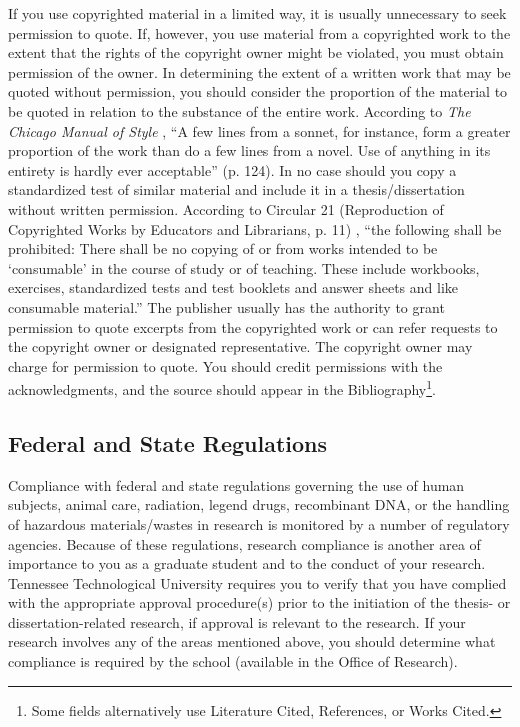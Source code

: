 If you use copyrighted material in a limited way, it is usually
unnecessary to seek permission to quote. If, however, you use material
from a copyrighted work to the extent that the rights of the copyright
owner might be violated, you must obtain permission of the owner. In
determining the extent of a written work that may be quoted without
permission, you should consider the proportion of the material to be
quoted in relation to the substance of the entire work. According to
\textit{The Chicago Manual of Style} \cite{chicago1982}, ``A few lines
from a sonnet, for instance, form a greater proportion of the work
than do a few lines from a novel. Use of anything in its entirety is
hardly ever acceptable'' (p. 124). In no case should you copy a
standardized test of similar material and include it in a
the\-sis/dis\-ser\-ta\-tion without written permission. According to
Circular 21 (Reproduction of Copyrighted Works by Educators and
Librarians, p. 11) \cite{loc1988}, ``\textellipsis{}the following
shall be prohibited: \textellipsis{} There shall be no copying of or
from works intended to be `consumable' in the course of study or of
teaching.  These include workbooks, exercises, standardized tests and
test booklets and answer sheets and like consumable material.'' The
publisher usually has the authority to grant permission to quote
excerpts from the copyrighted work or can refer requests to the
copyright owner or designated representative.  The copyright owner may
charge for permission to quote. You should credit permissions with the
acknowledgments, and the source should appear in the
Bibliography\footnote{Some fields alternatively use Literature Cited,
  References, or Works Cited.}.


\subsection{Federal and State Regulations}
\label{sec:FederalAndStateRegulations}

Compliance with federal and state regulations governing the use of
human subjects, animal care, radiation, legend drugs, recombinant DNA,
or the handling of hazardous materials/wastes in research is monitored
by a number of regulatory agencies. Because of these regulations,
research compliance is another area of importance to you as a graduate
student and to the conduct of your research. Tennessee Technological
University requires you to verify that you have complied with the
appropriate approval procedure(s) prior to the initiation of the
thesis- or dissertation-related research, if approval is relevant to
the research. If your research involves any of the areas mentioned
above, you should determine what compliance is required by the school
(available in the Office of Research).



